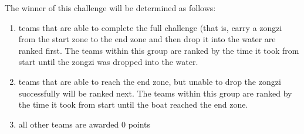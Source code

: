 \documentclass[12pt]{hurocup}
\begin{document}

\begin{lawlist}[DBC]

\item \label{dbc-winner} The winner of this challenge will be
  determined as follows:
  \begin{enumerate}
    \item teams that are able to complete the full challenge (that is,
      carry a zongzi from the start zone to the end zone and then drop
      it into the water are ranked first. The teams within this group
      are ranked by the time it took from start until the zongzi was
      dropped into the water.
    \item teams that are able to reach the end zone, but unable to
      drop the zongzi successfully will be ranked next. The teams
      within this group are ranked by the time it took from start
      until the boat reached the end zone.
    \item all other teams are awarded 0 points
  \end{enumerate}

\end{lawlist}
\end{document}
